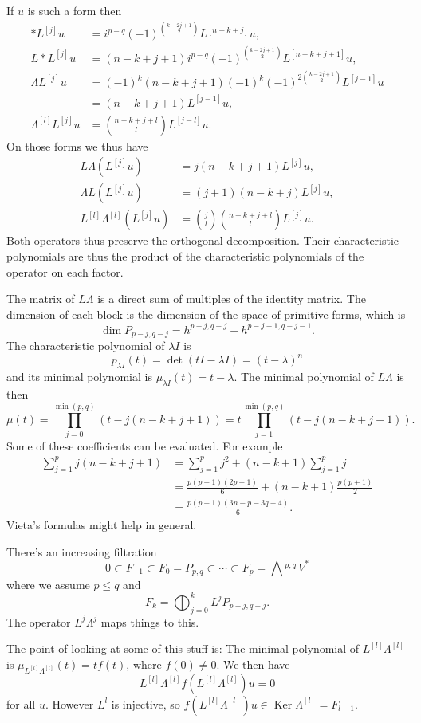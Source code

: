 \documentclass[11pt]{article}
\theoremstyle{definition}
\def\^#1{^{[#1]}}
\DeclareMathOperator{\Ker}{Ker}
\newcommand{\ext}[1]{\bigwedge{}^{\!\!#1}\,}
\begin{document}
If $u$ is such a form then
\begin{align*}
* L\^{j} u
&= i^{p-q} (-1)^{\binom{k-2j+1}{2}} L\^{n-k+j} u,
\\
L * L\^{j} u
&= (n-k+j+1) i^{p-q} (-1)^{\binom{k-2j+1}{2}} L\^{n-k+j+1} u,
\\
\Lambda L\^{j} u
&= (-1)^k (n-k+j+1) (-1)^k (-1)^{2 \binom{k-2j+1}{2}} L\^{j-1} u
\\
&= (n-k+j+1) L\^{j-1} u,
\\
\Lambda\^{l} L\^{j} u
&= \binom{n-k+j+l}{l} L\^{j-l} u.
\end{align*}
On those forms we thus have
\begin{align*}
L\Lambda(L\^j u)
&= j (n-k+j+1) L\^j u,
\\
\Lambda L (L\^j u)
&= (j+1) (n-k+j) L\^j u,
\\
L\^l \Lambda\^l (L\^j u)
&= \binom{j}{l} \binom{n-k+j+l}{l} L\^j u.
\end{align*}
Both operators thus preserve the orthogonal decomposition.
Their characteristic polynomials are thus the product of the characteristic
polynomials of the operator on each factor.

The matrix of $L\Lambda$ is a direct sum of multiples of the identity matrix.
The dimension of each block is the dimension of the space of primitive
forms, which is
$$
\dim P_{p-j,q-j} = h^{p-j,q-j} - h^{p-j-1,q-j-1}.
$$
The characteristic polynomial of $\lambda I$ is
$$
p_{\lambda I}(t)
= \det(t I - \lambda I)
= (t - \lambda)^n
$$
and its minimal polynomial is $\mu_{\lambda I}(t) = t - \lambda$.
The minimal polynomial of $L\Lambda$ is then
$$
\mu(t)
= \prod_{j=0}^{\min(p,q)} \!\!\! (t - j(n-k+j+1))
= t \!\!\! \prod_{j=1}^{\min(p,q)} \!\!\! (t - j(n-k+j+1)).
$$
Some of these coefficients can be evaluated. For example
\begin{align*}
\sum_{j=1}^p j(n-k+j+1)
&= \sum_{j=1}^p j^2 + (n-k+1) \sum_{j=1}^p j
\\
&= \frac{p(p+1)(2p+1)}{6} + (n-k+1) \frac{p(p+1)}{2}
\\
&= \frac{p(p+1)(3n-p-3q+4)}{6}.
\end{align*}
Vieta's formulas might help in general.


There's an increasing filtration
$$
0
\subset F_{-1}
\subset F_0 = P_{p,q}
\subset \cdots
\subset F_p = \ext{p,q} V^*
$$
where we assume $p \leq q$ and
$$
F_k = \bigoplus_{j=0}^k L^j P_{p-j,q-j}.
$$
The operator $L^j\Lambda^j$ maps things to this.

The point of looking at some of this stuff is:
The minimal polynomial of $L\^l\Lambda\^l$ is $\mu_{L\^l \Lambda\^l}(t) = t f(t)$,
where $f(0) \not= 0$.
We then have
$$
L\^l \Lambda\^l f(L\^l \Lambda\^l) u = 0
$$
for all $u$.
However $L^l$ is injective, so $f(L\^l \Lambda\^l) u \in \Ker \Lambda\^l =
F_{l-1}$.
\end{document}
